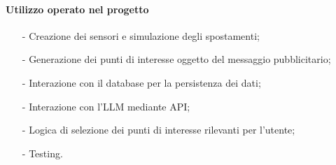 \documentclass[10pt]{article}
\begin{document}
\begin{justify}
            \paragraph{Utilizzo operato nel progetto}
                \begin{itemize}
                    \item[-] Creazione dei sensori e simulazione degli spostamenti;
                    \item[-] Generazione dei punti di interesse oggetto del messaggio pubblicitario;
                    \item[-] Interazione con il database per la persistenza dei dati;
                    \item[-] Interazione con l'LLM mediante API;
                    \item[-] Logica di selezione dei punti di interesse rilevanti per l'utente;
                    \item[-] Testing.
                \end{itemize}

\end{justify}
\end{document}
